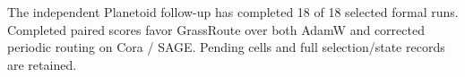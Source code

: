 The independent Planetoid follow-up has completed 18 of 18 selected formal runs. Completed paired scores favor GrassRoute over both AdamW and corrected periodic routing on Cora / SAGE. Pending cells and full selection/state records are retained.
